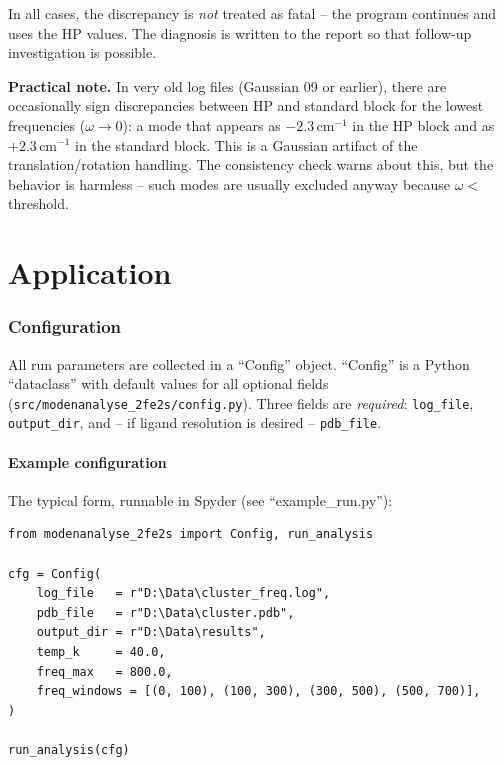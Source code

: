 \documentclass[11pt,a4paper,twoside]{article}
\theoremstyle{remark}
\begin{document}
In all cases, the discrepancy is \emph{not} treated as fatal --
the program continues and uses the HP values. The diagnosis is
written to the report so that follow-up investigation is possible.

\begin{warnbox}
\textbf{Practical note.} In very old log files (Gaussian 09 or
earlier), there are occasionally sign discrepancies between HP and
standard block for the lowest frequencies ($\omega \to 0$): a mode
that appears as $-2.3$\,cm$^{-1}$ in the HP block and as
$+2.3$\,cm$^{-1}$ in the standard block. This is a Gaussian
artifact of the translation/rotation handling. The consistency
check warns about this, but the behavior is harmless -- such modes
are usually excluded anyway because $\omega < $ threshold.
\end{warnbox}


\part{Application}

\section{Configuration}
\label{sec:konfig}

All run parameters are collected in a ``Config'' object.
``Config'' is a Python ``dataclass'' with default values for all
optional fields (\texttt{src/modenanalyse\_2fe2s/config.py}). Three
fields are \emph{required}: \texttt{log\_file}, \texttt{output\_dir},
and -- if ligand resolution is desired -- \texttt{pdb\_file}.

\subsection{Example configuration}

The typical form, runnable in Spyder (see ``example\_run.py''):

\begin{lstlisting}[style=python]
from modenanalyse_2fe2s import Config, run_analysis

cfg = Config(
    log_file   = r"D:\Data\cluster_freq.log",
    pdb_file   = r"D:\Data\cluster.pdb",
    output_dir = r"D:\Data\results",
    temp_k     = 40.0,
    freq_max   = 800.0,
    freq_windows = [(0, 100), (100, 300), (300, 500), (500, 700)],
)

run_analysis(cfg)
\end{lstlisting}
\end{document}
